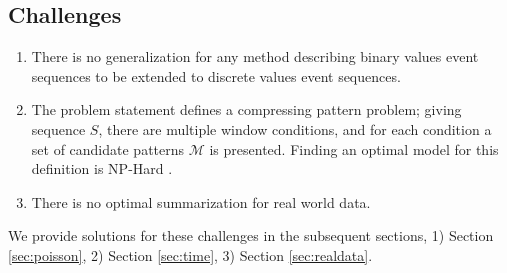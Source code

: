\subsection{Challenges}
\begin{enumerate}
\item There is no generalization for any method describing binary values event sequences to be extended to discrete values event sequences.
\item The problem statement defines a compressing pattern problem; giving sequence $S$, there are multiple window conditions, and for each condition a set of candidate patterns $\mathcal{M}$ is presented. Finding an optimal model for this definition is NP-Hard \cite{Lam:2014}.
\item There is no optimal summarization for real world data.

\end{enumerate}

We provide solutions for these challenges in the subsequent sections, 1) Section \ref{sec:poisson}, 2) Section \ref{sec:time}, 3) Section \ref{sec:realdata}.


